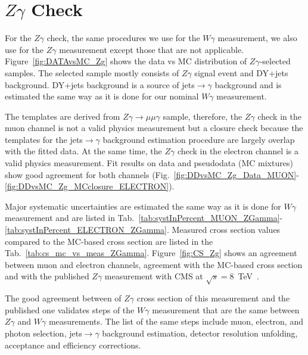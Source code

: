 \chapter{$Z\gamma$ Check}
\label{sec:ZgCheck}

For the $Z\gamma$ check, the same procedures we use for the $W\gamma$ measurement, we also use for the $Z\gamma$ measurement except those that are not applicable. Figure~\ref{fig:DATAvsMC_Zg} shows the data vs MC distribution of $Z\gamma$-selected samples. The selected sample mostly consists of $Z\gamma$ signal event and DY+jets background. DY+jets background is a source of jets$\rightarrow\gamma$ background and is estimated the same way as it is done for our nominal $W\gamma$ measurement.  

The templates are derived from $Z\gamma\rightarrow\mu\mu\gamma$ sample, therefore, the $Z\gamma$ check in the muon channel is not a valid physics measurement but a closure check because the templates for the jets$\rightarrow\gamma$ background estimation procedure are largely overlap with the fitted data. At the same time, the $Z\gamma$ check in the electron channel is a valid physics measurement. Fit results on data and pseudodata (MC mixtures) show good agreement for both channels (Fig.~\ref{fig:DDvsMC_Zg_Data_MUON}-\ref{fig:DDvsMC_Zg_MCclosure_ELECTRON}). %

Major systematic uncertainties are estimated the same way as it is done for $W\gamma$ measurement and are listed in Tab.~\ref{tab:systInPercent_MUON_ZGamma}-\ref{tab:systInPercent_ELECTRON_ZGamma}. Measured cross section values compared to the MC-based cross section are listed in the Tab.~\ref{tab:cs_mc_vs_meas_ZGamma}. Figure~\ref{fig:CS_Zg} shows an agreement between muon and electron channels, agreement with the MC-based cross section and with the published $Z\gamma$ measurement with CMS at $\sqrt{s}=$8~TeV~\cite{ref_Zg8TeV}.

 The good agreement between of $Z\gamma$ cross section of this measurement and the published one validates steps of the $W\gamma$ measurement that are the same between $Z\gamma$ and $W\gamma$ measurements. The list of the same steps include muon, electron, and photon selection, jets$\rightarrow\gamma$ background estimation, detector resolution unfolding, acceptance and efficiency corrections.


